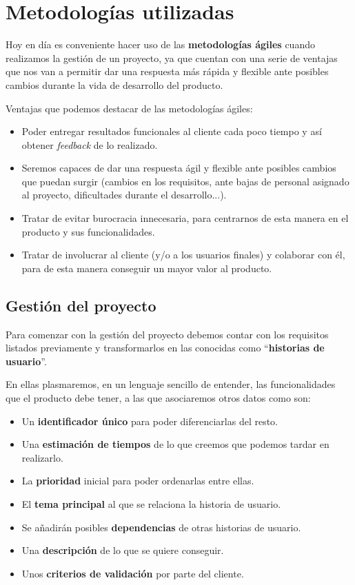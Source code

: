 \documentclass{\ClassPath/viu-tfm-template}
\begin{document}
\chapter{Metodologías utilizadas}

Hoy en día es conveniente hacer uso de las \textbf{metodologías ágiles} cuando realizamos la gestión de un proyecto, ya que cuentan con una serie de ventajas que nos van a permitir dar una respuesta más rápida y flexible ante posibles cambios durante la vida de desarrollo del producto.

Ventajas que podemos destacar de las metodologías ágiles:

\begin{itemize}
    \item Poder entregar resultados funcionales al cliente cada poco tiempo y así obtener \textit{feedback} de lo realizado.
    \item Seremos capaces de dar una respuesta ágil y flexible ante posibles cambios que puedan surgir (cambios en los requisitos, ante bajas de personal asignado al proyecto, dificultades durante el desarrollo...).
    \item Tratar de evitar burocracia innecesaria, para centrarnos de esta manera en el producto y sus funcionalidades.
    \item Tratar de involucrar al cliente (y/o a los usuarios finales) y colaborar con él, para de esta manera conseguir un mayor valor al producto.
\end{itemize}

\section{Gestión del proyecto}

Para comenzar con la gestión del proyecto debemos contar con los requisitos listados previamente y transformarlos en las conocidas como “\textbf{historias de usuario}”.

En ellas plasmaremos, en un lenguaje sencillo de entender, las funcionalidades que el producto debe tener, a las que asociaremos otros datos como son:

\begin{itemize}
    \item Un \textbf{identificador único} para poder diferenciarlas del resto.
    \item Una \textbf{estimación de tiempos} de lo que creemos que podemos tardar en realizarlo.
    \item La \textbf{prioridad} inicial para poder ordenarlas entre ellas.
    \item El \textbf{tema principal} al que se relaciona la historia de usuario.
    \item Se añadirán posibles \textbf{dependencias} de otras historias de usuario.
    \item Una \textbf{descripción} de lo que se quiere conseguir.
    \item Unos \textbf{criterios de validación} por parte del cliente.
\end{itemize}
\end{document}
